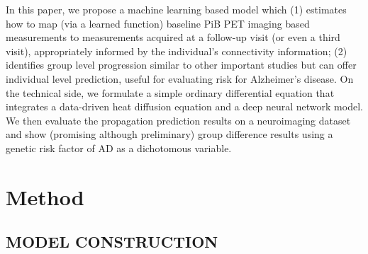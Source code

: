 \documentclass{article}
\begin{document}
In this paper, we propose a machine learning 
based model which (1) estimates how to map (via a learned function) 
baseline PiB PET imaging based measurements to measurements 
acquired at a follow-up visit (or even a third visit), 
appropriately informed by the individual's 
connectivity information; 
(2) identifies group level progression similar 
to other important studies \cite{raj_kuceyeski_weiner_2012,hwang_ravi_adluru_bendlin_johnson_singh_2018}
but can offer individual level prediction, 
useful for evaluating risk for 
Alzheimer's disease. 
On the technical side, we formulate a simple
ordinary differential equation that integrates a data-driven heat diffusion equation and a
deep neural network model.
We then evaluate the propagation prediction results on a
neuroimaging dataset and show (promising although preliminary)
group difference results using a genetic risk factor of AD as a dichotomous variable.


\section{Method}
\label{sec:method}

\subsection{MODEL CONSTRUCTION}
\label{ssec:MODEL}
\end{document}
